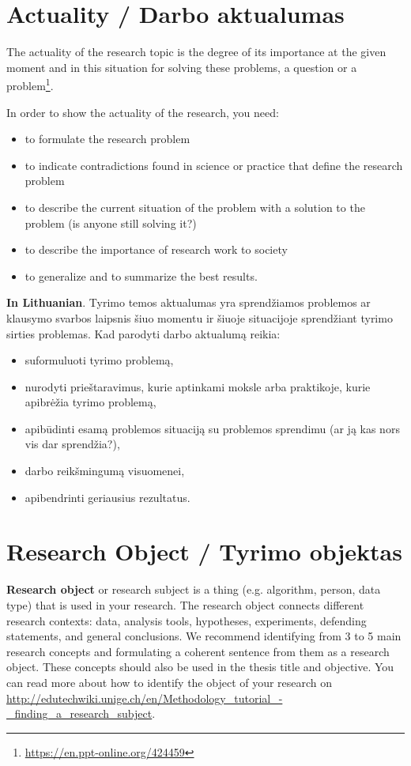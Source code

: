 \section*{Actuality / Darbo aktualumas}

The actuality of the research topic is the degree of its importance at the given moment and in this situation for solving these problems, a question or a problem\footnote{\url{https://en.ppt-online.org/424459}}.

In order to show the actuality of the research, you need:
\begin{itemize}
    \item to formulate the research problem
    \item to indicate contradictions found in science or practice that define the research problem
    \item to describe the current situation of the problem with a solution to the problem (is anyone still solving it?)
    \item to describe the importance of research work to society
    \item to generalize and to summarize the best results.
\end{itemize}

\textbf{In Lithuanian}.
Tyrimo temos aktualumas yra sprendžiamos problemos ar klausymo svarbos laipsnis šiuo momentu ir šiuoje situacijoje sprendžiant tyrimo sirties problemas.
Kad parodyti darbo aktualumą reikia:
\begin{itemize}
    \item suformuluoti tyrimo problemą,
    \item nurodyti prieštaravimus, kurie aptinkami moksle arba praktikoje, kurie apibrėžia tyrimo problemą, 
    \item apibūdinti esamą problemos situaciją su problemos sprendimu (ar ją kas nors vis dar sprendžia?),
    \item darbo reikšmingumą visuomenei,
    \item apibendrinti geriausius rezultatus.
\end{itemize}


\section*{Research Object / Tyrimo objektas}

\textbf{Research object} or research subject is a thing (e.g. algorithm, person, data type) that is used in your research. The research object connects different research contexts: data, analysis tools, hypotheses, experiments, defending statements, and general conclusions. We recommend identifying from 3 to 5 main research concepts and formulating a coherent sentence from them as a research object.
These concepts should also be used in the thesis title and objective. You can read more about how to identify the object of your research on  \url{http://edutechwiki.unige.ch/en/Methodology_tutorial_-_finding_a_research_subject}.

